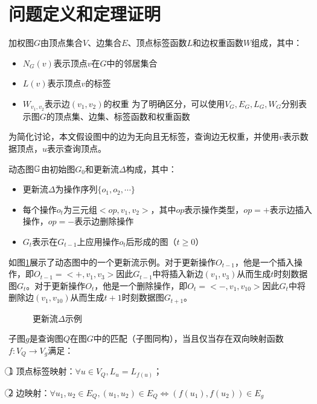 \section{问题定义和定理证明}
\label{ch3:definition}
\begin{definition}[加权图]
    加权图$G$由顶点集合$V$、边集合$E$、顶点标签函数$L$和边权重函数$W$组成，其中：

    \begin{itemize}
    \item $N_G(v)$表示顶点$v$在$G$中的邻居集合
    \item $L(v)$表示顶点$v$的标签
    \item $W_{v_1, v_2}$表示边$(v_1, v_2)$的权重
    为了明确区分，可以使用$V_G, E_G, L_G, W_G$分别表示图$G$的顶点集、边集、标签函数和权重函数
    \end{itemize}  
    \end{definition}
    
    为简化讨论，本文假设图中的边为无向且无标签，查询边无权重，并使用$v$表示数据顶点，$u$表示查询顶点。
    
    \begin{definition}[动态图]\label{def:dynamic-graph}
    动态图$\mathbb{G}$由初始图$G_0$和更新流$\Delta$构成，其中：

    \begin{itemize}
    \item 更新流$\Delta$为操作序列$\{o_1, o_2, \cdots\}$
    \item 每个操作$o_t$为三元组$<op, v_1, v_2>$，其中$op$表示操作类型，$op=+$表示边插入操作，$op=-$表示边删除操作
    \item  $G_t$表示在$G_{t-1}$上应用操作$o_t$后形成的图（$t \geq 0$）    
    \end{itemize} 
    \end{definition}
    如图\ref{fig:exp:updatestream}展示了动态图中的一个更新流示例。对于更新操作$O_{t-1}$，他是一个插入操作，即$O_{t-1}=<+,v_1,v_3>$因此$G_{t-1}$中将插入新边$(v_1,v_3)$从而生成$t$时刻数据图$G_t$。对于更新操作$O_{t}$，他是一个删除操作，即$O_{t}=<-,v_1,v_{10}>$因此$G_{t}$中将删除边$(v_1,v_{10})$从而生成$t+1$时刻数据图$G_{t+1}$。
    \begin{figure}[h!]
        \centering
        \caption{更新流$\Delta$示例}
        \label{fig:exp:updatestream}
        \end{figure}    
      
    
    \begin{definition}[子图匹配]\label{def:subgraph-matching}
    子图$g$是查询图$Q$在图$G$中的匹配（子图同构），当且仅当存在双向映射函数$f: V_Q \rightarrow V_g$满足：
    
    \textcircled{1} 顶点标签映射：$\forall u \in V_Q, L_u = L_{f(u)}$；
    
    \textcircled{2} 边映射：$\forall u_1, u_2\in E_Q, (u_1, u_2) \in E_Q \Leftrightarrow (f(u_1), f(u_2)) \in E_g$
    \end{definition}
    
